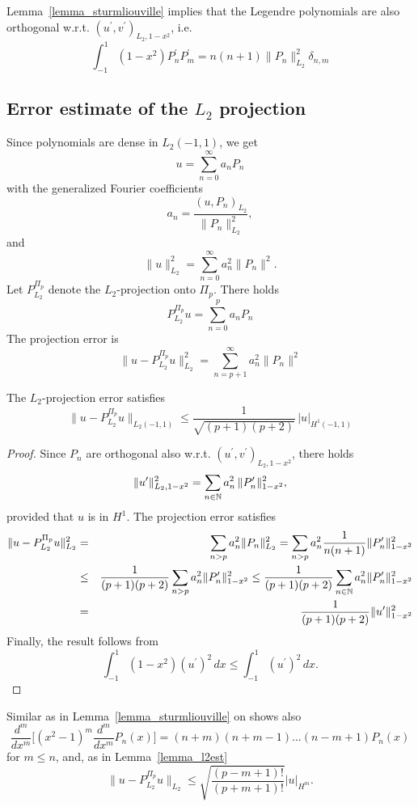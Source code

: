 Lemma~\ref{lemma_sturmliouville} implies that the Legendre polynomials are also orthogonal w.r.t. $(u^\prime, v^\prime)_{L_2, 1-x^2}$, i.e.
$$
\int_{-1}^1 (1-x^2) P_n^\prime P_m^\prime = n(n+1) \| P_n \|_{L_2}^2 \delta_{n,m}
$$


\subsection{Error estimate of the $L_2$ projection}
Since polynomials are dense in $L_2(-1,1)$, we get
$$
u = \sum_{n=0}^\infty a_n P_n
$$
with the generalized Fourier coefficients
$$
a_n = \frac{ (u, P_n)_{L_2} } { \| P_n \|^2_{L_2} },
$$
and
$$
\| u \|_{L_2}^2 = \sum_{n=0}^\infty a_n^2 \| P_n \|^2.
$$
Let $P_{L_2}^{\Pi_p}$ denote the $L_2$-projection onto $\Pi_p$. There holds
$$
P_{L_2}^{\Pi_p} u = \sum_{n=0}^p a_n P_n
$$
The projection error is
$$
\| u - P_{L_2}^{\Pi_p} u \|_{L_2}^2 = \sum_{n=p+1}^\infty a_n^2 \| P_n \|^2
$$
\begin{lemma} \label{lemma_l2est}  The $L_2$-projection error satisfies
\begin{equation}
\| u - P_{L_2}^{\Pi_p} u \|_{L_2(-1,1)} \leq \frac{1}{\sqrt{(p+1)(p+2)}} \, | u |_{H^1(-1,1)}
\end{equation}
\end{lemma}
\begin{proof} Since $P_n$ are orthogonal also w.r.t. $(u^\prime, v^\prime)_{L_2, 1-x^2}$,
there holds
$$
\| u^\prime \|_{L_2, 1-x^2}^2 = \sum_{n \in {\mathbb N}} a_n^2 \, \| P_n^\prime \|_{1-x^2}^2,
$$
provided that $u$ is in $H^1$.
The projection error satisfies
\begin{eqnarray*}
\| u - P_{L_2}^{\Pi_p} u \|^2_{L_2} & = & \sum_{n > p} a_n^2 \| P_n \|^2_{L_2} 
 = \sum_{n > p} a_n^2 \frac{1}{n (n+1)} \| P_n^\prime \|^2_{1-x^2} \\
& \leq & \frac{1}{(p+1)(p+2)} \sum_{n > p} a_n^2 \|P_n^\prime \|^2_{1-x^2} 
\leq  \frac{1}{(p+1)(p+2)} \sum_{n \in {\mathbb N}} a_n^2 \|P_n^\prime \|^2_{1-x^2} \\
& = & \frac{1}{(p+1)(p+2)} \| u^\prime \|_{1-x^2}^2 \\
\end{eqnarray*}
Finally, the result follows from 
$$
\int_{-1}^1 (1-x^2) (u^\prime)^2 \, dx \leq \int_{-1}^1 (u^\prime)^2 \, dx.
$$
\end{proof}
\newpage
Similar as in Lemma~\ref{lemma_sturmliouville} on shows also
$$
\frac{d^m}{dx^m} \big[ (x^2-1)^m \frac{d^m}{dx^m} P_n(x) \big] = (n+m)(n+m-1) \ldots (n-m+1) P_n(x)
$$
for $m \leq n$, and, as in Lemma~\ref{lemma_l2est}
$$
\| u - P_{L_2}^{\Pi_p} u \|_{L_2} \leq \sqrt{ \frac{ (p-m+1)! }{ (p+m+1)! } } | u |_{H^m}.
$$


